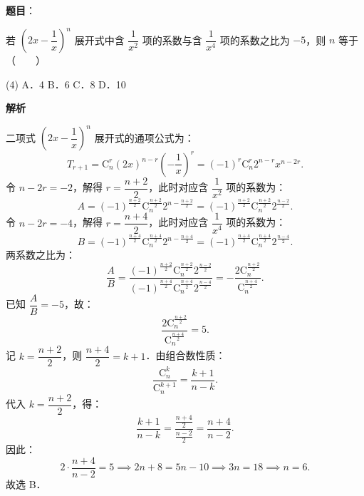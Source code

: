 \begin{answer}

\textbf{题目}：

若 $\left(2x - \dfrac{1}{x}\right)^n$ 展开式中含 $\dfrac{1}{x^2}$ 项的系数与含 $\dfrac{1}{x^4}$ 项的系数之比为 $-5$，则 $n$ 等于\mbox{（　　）}

\begin{gkopts}(4)
\task A．4
\task B．6
\task C．8
\task D．10
\end{gkopts}

\textbf{解析}

二项式 $\left(2x - \dfrac{1}{x}\right)^n$ 展开式的通项公式为：
\nopagebreak[4]
\[
T_{r+1} = \mathrm{C}_n^r (2x)^{n-r} \left(-\frac{1}{x}\right)^r = (-1)^r \mathrm{C}_n^r 2^{n-r} x^{n - 2r}.
\]
令 $n - 2r = -2$，解得 $r = \dfrac{n+2}{2}$，此时对应含 $\dfrac{1}{x^2}$ 项的系数为：
\nopagebreak[4]
\[
A = (-1)^{\frac{n+2}{2}} \mathrm{C}_n^{\frac{n+2}{2}} 2^{n - \frac{n+2}{2}} = (-1)^{\frac{n+2}{2}} \mathrm{C}_n^{\frac{n+2}{2}} 2^{\frac{n-2}{2}}.
\]
令 $n - 2r = -4$，解得 $r = \dfrac{n+4}{2}$，此时对应含 $\dfrac{1}{x^4}$ 项的系数为：
\nopagebreak[4]
\[
B = (-1)^{\frac{n+4}{2}} \mathrm{C}_n^{\frac{n+4}{2}} 2^{n - \frac{n+4}{2}} = (-1)^{\frac{n+4}{2}} \mathrm{C}_n^{\frac{n+4}{2}} 2^{\frac{n-4}{2}}.
\]
两系数之比为：
\nopagebreak[4]
\[
\frac{A}{B} = \frac{(-1)^{\frac{n+2}{2}} \mathrm{C}_n^{\frac{n+2}{2}} 2^{\frac{n-2}{2}}}{(-1)^{\frac{n+4}{2}} \mathrm{C}_n^{\frac{n+4}{2}} 2^{\frac{n-4}{2}}} = -\frac{2 \mathrm{C}_n^{\frac{n+2}{2}}}{\mathrm{C}_n^{\frac{n+4}{2}}}.
\]
已知 $\dfrac{A}{B} = -5$，故：
\nopagebreak[4]
\[
\frac{2 \mathrm{C}_n^{\frac{n+2}{2}}}{\mathrm{C}_n^{\frac{n+4}{2}}} = 5.
\]
记 $k = \dfrac{n+2}{2}$，则 $\dfrac{n+4}{2} = k + 1$．由组合数性质：
\nopagebreak[4]
\[
\frac{\mathrm{C}_n^k}{\mathrm{C}_n^{k+1}} = \frac{k+1}{n-k}.
\]
代入 $k = \dfrac{n+2}{2}$，得：
\nopagebreak[4]
\[
\frac{k+1}{n-k} = \frac{\frac{n+4}{2}}{\frac{n-2}{2}} = \frac{n+4}{n-2}.
\]
因此：
\nopagebreak[4]
\[
2 \cdot \frac{n+4}{n-2} = 5 \implies 2n + 8 = 5n - 10 \implies 3n = 18 \implies n = 6.
\]
故选 B．


\end{answer}
